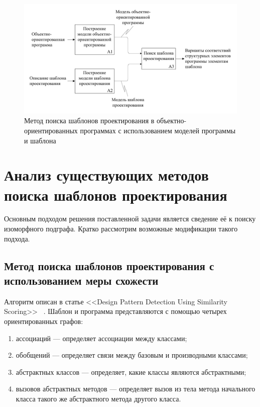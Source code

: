 \begin{figure}
\centering
\includegraphics[width=\textwidth]{inc/idef0-general.pdf}
\caption{Метод поиска шаблонов проектирования в объектно-ориентированных программах с использованием моделей программы и шаблона}
\label{fig:idef0-general}
\end{figure}

\section{Анализ существующих методов поиска шаблонов проектирования}

Основным подходом решения поставленной задачи является сведение её к поиску
изоморфного подграфа.
Кратко рассмотрим возможные модификации такого подхода.

\subsection{Метод поиска шаблонов проектирования с использованием меры схожести}

Алгоритм описан в статье <<Design Pattern Detection Using Similarity Scoring>>
~\cite{DesignPatternSimilarityScoring}.
Шаблон и программа представляются с помощью четырех ориентированных графов:
\begin{enumerate}
\item ассоциаций --- определяет ассоциации между классами;
\item обобщений --- определяет связи между базовым и производными классами;
\item абстрактных классов --- определяет, какие классы являются абстрактными;
\item вызовов абстрактных методов --- определяет вызов из тела метода начального
класса такого же абстрактного метода другого класса.
\end{enumerate}

